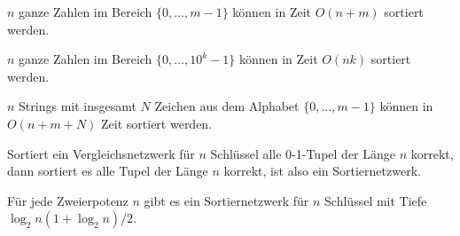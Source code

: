 \documentclass{cheat-sheet}
\begin{document}
\fbox{
  \begin{minipage}{8.5cm}
    \hfill\vspace{2.5cm}
  \end{minipage}
}

\begin{satz}
  $n$ ganze Zahlen im Bereich $\{ 0, ..., m-1 \}$ können in Zeit $O(n+m)$ sortiert werden.
\end{satz}

\begin{satz}
  $n$ ganze Zahlen im Bereich $\{ 0, ..., 10^k-1 \}$ können in Zeit $O(nk)$ sortiert werden.
\end{satz}


\begin{satz}
  $n$ Strings mit insgesamt $N$ Zeichen aus dem Alphabet $\{ 0, ..., m-1 \}$ können in $O(n + m + N)$ Zeit sortiert werden.
\end{satz}


\begin{satz}[0-1-Prinzip]
  Sortiert ein Vergleichsnetzwerk für $n$ Schlüssel alle 0-1-Tupel der Länge $n$ korrekt, dann sortiert es alle Tupel der Länge $n$ korrekt, ist also ein Sortiernetzwerk.
\end{satz}

\begin{satz}
  Für jede Zweierpotenz $n$ gibt es ein Sortiernetzwerk für $n$ Schlüssel mit Tiefe $\log_2 n (1 + \log_2 n) / 2$.
\end{satz}








\end{document}
